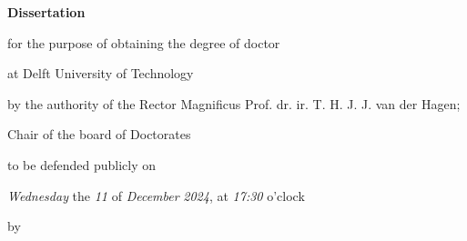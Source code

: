 \begin{titlepage}

\begin{center}

\vspace*{2\bigskipamount}

{\makeatletter
\titlestyle\bfseries\LARGE\@title
\makeatother}

{\makeatletter
\ifx\@subtitle\undefined\else
    \bigskip
    \titlefont\titleshape\Large\@subtitle
\fi
\makeatother}

\end{center}

\cleardoublepage
\thispagestyle{empty}

\begin{center}


\vspace*{2\bigskipamount}

{\makeatletter
\titlestyle\bfseries\LARGE\@title
\makeatother}

{\makeatletter
\ifx\@subtitle\undefined\else
    \bigskip
    \titlefont\titleshape\Large\@subtitle
\fi
\makeatother}

\vfill


{\Large\titlefont\bfseries Dissertation}

\bigskip
\bigskip

for the purpose of obtaining the degree of doctor

at Delft University of Technology

by the authority of the Rector Magnificus Prof. dr. ir. T. H. J. J. van der Hagen;

Chair of the board of Doctorates

to be defended publicly on

\textit{Wednesday} the \textit{11} of \textit{December}
\textit{2024}, at \textit{17:30} o’clock

\bigskip
\bigskip

by

\bigskip
\bigskip


\end{center}
\end{titlepage}

